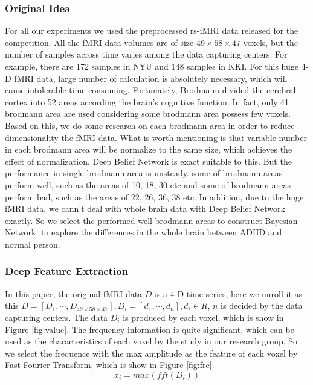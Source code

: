 \documentclass[10pt,twocolumn,letterpaper]{article}
\begin{document}
\subsubsection{Original Idea}
For all our experiments we used the preprocessed rs-fMRI data released for the competition. All the fMRI data volumes are of size $49\times58\times47$ voxels, but the number of samples across time varies among the data capturing centers. For example, there are 172 samples in NYU and 148 samples in KKI. For this huge 4-D fMRI data, large number of calculation is absolutely necessary, which will cause intolerable time consuming. Fortunately, Brodmann divided the cerebral cortex into 52 areas according the brain's cognitive function\cite{22}.  In fact, only 41 brodmann area are used considering some brodmann area possess few voxels. Based on this, we do some research on each brodmann area in order to reduce dimensionality the fMRI data. What is worth mentioning is that variable number in each brodmann area will be normalize to the same size, which achieves the effect of normalization. Deep Belief Network is exact suitable to this. But the performance in single brodmann area is unsteady. some of brodmann areas perform well, such as the areas of 10, 18, 30 etc and some of brodmann areas perform bad, such as the areas of 22, 26, 36, 38 etc. In addition, due to the huge fMRI data, we cann't deal with whole brain data with Deep Belief Network exactly. So we select the performed-well brodmann areas to construct Bayesian Network, to explore the differences in the whole brain between ADHD and normal person. 







\subsubsection{Deep Feature Extraction}
In this paper, the original fMRI data $D$ is a 4-D time series, here we unroll it as this $D=[D_1,\cdots,D_{49\times58\times47}], D_i=[d_1,\cdots,d_{n}], d_i \in R$, $n$ is decided by the data capturing centers. The data $D_i$ is produced by each voxel, which is show in Figure \ref{fig:value}.  The frequency information is quite significant\cite{23}, which can be used as the characteristics of each voxel by the study in our research group. So we select the frequence with the max amplitude as the feature of each voxel by Fast Fourier Transform, which is show in Figure \ref{fig:fre}. 
\begin{equation}
x_i = max(fft(D_i))
\end{equation}
\end{document}
